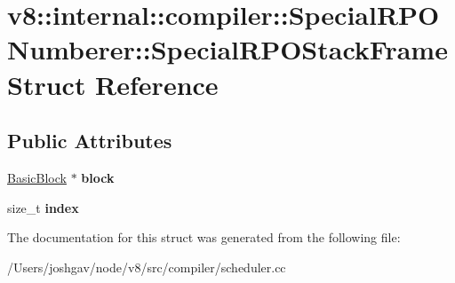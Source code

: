 \hypertarget{structv8_1_1internal_1_1compiler_1_1_special_r_p_o_numberer_1_1_special_r_p_o_stack_frame}{}\section{v8\+:\+:internal\+:\+:compiler\+:\+:Special\+R\+P\+O\+Numberer\+:\+:Special\+R\+P\+O\+Stack\+Frame Struct Reference}
\label{structv8_1_1internal_1_1compiler_1_1_special_r_p_o_numberer_1_1_special_r_p_o_stack_frame}
\subsection*{Public Attributes}
\begin{DoxyCompactItemize}
\item 
\hyperlink{classv8_1_1internal_1_1compiler_1_1_basic_block}{Basic\+Block} $\ast$ {\bfseries block}\hypertarget{structv8_1_1internal_1_1compiler_1_1_special_r_p_o_numberer_1_1_special_r_p_o_stack_frame_a624e9997f5630ea9d3bff0045925d3f4}{}\label{structv8_1_1internal_1_1compiler_1_1_special_r_p_o_numberer_1_1_special_r_p_o_stack_frame_a624e9997f5630ea9d3bff0045925d3f4}

\item 
size\+\_\+t {\bfseries index}\hypertarget{structv8_1_1internal_1_1compiler_1_1_special_r_p_o_numberer_1_1_special_r_p_o_stack_frame_a82ef9e0616f69d58844ecdf6c6199946}{}\label{structv8_1_1internal_1_1compiler_1_1_special_r_p_o_numberer_1_1_special_r_p_o_stack_frame_a82ef9e0616f69d58844ecdf6c6199946}

\end{DoxyCompactItemize}


The documentation for this struct was generated from the following file\+:\begin{DoxyCompactItemize}
\item 
/\+Users/joshgav/node/v8/src/compiler/scheduler.\+cc\end{DoxyCompactItemize}
